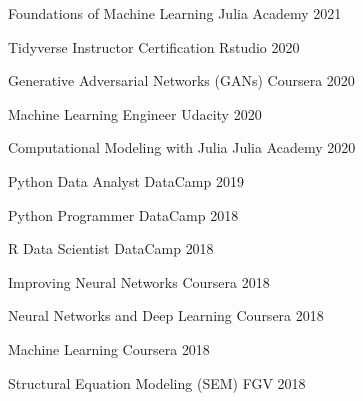 

\begin{cvhonors}


	\cvhonor
	{Foundations of Machine Learning} %
	{} %
	{Julia Academy} %
	{2021} %

	\cvhonor
	{Tidyverse Instructor Certification} %
	{} %
	{Rstudio} %
	{2020} %

	\cvhonor
	{Generative Adversarial Networks (GANs)} %
	{} %
	{Coursera} %
	{2020} %

	\cvhonor
	{Machine Learning Engineer} %
	{} %
	{Udacity} %
	{2020} %

	\cvhonor
	{Computational Modeling with Julia} %
	{} %
	{Julia Academy} %
	{2020} %

	\cvhonor
	{Python Data Analyst} %
	{} %
	{DataCamp} %
	{2019} %

	\cvhonor
	{Python Programmer} %
	{} %
	{DataCamp} %
	{2018} %

	\cvhonor
	{R Data Scientist} %
	{} %
	{DataCamp} %
	{2018} %

	\cvhonor
	{Improving Neural Networks} %
	{} %
	{Coursera} %
	{2018} %

	\cvhonor
	{Neural Networks and Deep Learning} %
	{} %
	{Coursera} %
	{2018} %

	\cvhonor
	{Machine Learning} %
	{} %
	{Coursera} %
	{2018} %

	\cvhonor
	{Structural Equation Modeling (SEM)} %
	{} %
	{FGV} %
	{2018} %

\end{cvhonors}

